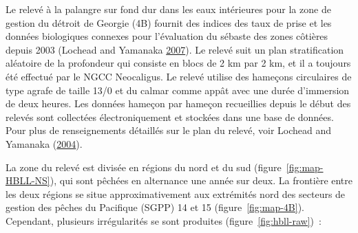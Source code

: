 \documentclass[11pt]{book}
\begin{document}
Le relevé à la palangre sur fond dur dans les eaux intérieures pour la zone de gestion du détroit de Georgie (4B) fournit des indices des taux de prise et les données biologiques connexes pour l'évaluation du sébaste des zones côtières depuis 2003 (Lochead and Yamanaka \protect\hyperlink{ref-lochead2007}{2007}). Le relevé suit un plan stratification aléatoire de la profondeur qui consiste en blocs de 2 km par 2 km, et il a toujours été effectué par le NGCC Neocaligus. Le relevé utilise des hameçons circulaires de type agrafe de taille 13/0 et du calmar comme appât avec une durée d'immersion de deux heures. Les données hameçon par hameçon recueillies depuis le début des relevés sont collectées électroniquement et stockées dans une base de données. Pour plus de renseignements détaillés sur le plan du relevé, voir Lochead and Yamanaka (\protect\hyperlink{ref-lochead2004}{2004}).

La zone du relevé est divisée en régions du nord et du sud (figure~\ref{fig:map-HBLL-NS}), qui sont pêchées en alternance une année sur deux. La frontière entre les deux régions se situe approximativement aux extrémités nord des secteurs de gestion des pêches du Pacifique (SGPP) 14 et 15 (figure~\ref{fig:map-4B}). Cependant, plusieurs irrégularités se sont produites (figure~\ref{fig:hbll-raw})~:
\end{document}
